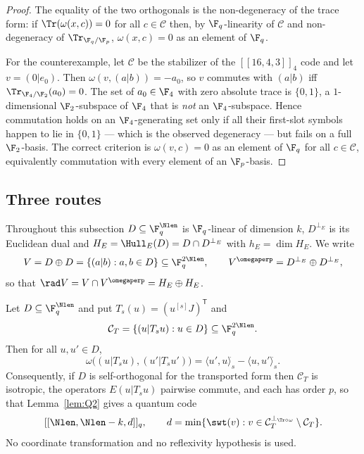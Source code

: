 \begin{proof}
The equality of the two orthogonals is the non-degeneracy of the trace form: if
$\Tr(\omega(x,c))=0$ for all $c\in\mathcal C$ then, by $\F_q$-linearity of
$\mathcal C$ and non-degeneracy of $\Tr_{\F_q/\F_p}$, $\omega(x,c)=0$ as an
element of $\F_q$.

For the counterexample, let $\mathcal C$ be the stabilizer of the
$[[16,4,3]]_4$ code and let $v=(0|e_0)$. Then
$\omega(v,(a|b))=-a_0$, so $v$ commutes with $(a|b)$ iff
$\Tr_{\F_4/\F_2}(a_0)=0$. The set of $a_0\in\F_4$ with zero absolute trace is
$\{0,1\}$, a $1$-dimensional $\F_2$-subspace of $\F_4$ that is \emph{not} an
$\F_4$-subspace. Hence commutation holds on an $\F_4$-generating set only if
all their first-slot symbols happen to lie in $\{0,1\}$ --- which is the
observed degeneracy --- but fails on a full $\F_2$-basis. The correct criterion
is $\omega(v,c)=0$ as an element of $\F_q$ for all $c\in\mathcal C$,
equivalently commutation with every element of an $\F_p$-basis.
\end{proof}

\subsection{Three routes}

Throughout this subsection $D\subseteq\F_q^{\Nlen}$ is $\F_q$-linear of
dimension $k$, $D^{\perp_E}$ is its Euclidean dual and
$H_E=\Hull_E(D)=D\cap D^{\perp_E}$ with $h_E=\dim H_E$. We write
\begin{equation}\label{eq:V}
  V=D\oplus D=\{(a|b):a,b\in D\}\subseteq\F_q^{2\Nlen},
  \qquad
  V^{\omegaperp}=D^{\perp_E}\oplus D^{\perp_E},
\end{equation}
so that $\rad V=V\cap V^{\omegaperp}=H_E\oplus H_E$.

\begin{theorem}
\label{thm:R1}
Let $D\subseteq\F_q^{\Nlen}$ and put $T_s(u)=(u^{[s]}J)^{\mathsf T}$ and
\[
  \mathcal C_T=\{(u|T_su):u\in D\}\subseteq\F_q^{2\Nlen}.
\]
Then for all $u,u'\in D$,
\[
  \omega\bigl((u|T_su),(u'|T_su')\bigr)
  =\langle u',u\rangle^{\widehat{}}_s-\langle u,u'\rangle^{\widehat{}}_s .
\]
Consequently, if $D$ is self-orthogonal for the transported form then
$\mathcal C_T$ is isotropic, the operators $E(u|T_su)$ pairwise commute, and
each has order $p$, so that Lemma~\ref{lem:Q2} gives a quantum code
\[
  [[\Nlen,\Nlen-k,d]]_q,\qquad
  d=\min\{\swt(v):v\in\mathcal C_T^{\perp_{\Tr\circ\omega}}\setminus
  \mathcal C_T\}.
\]
No coordinate transformation and no reflexivity hypothesis is used.
\end{theorem}

